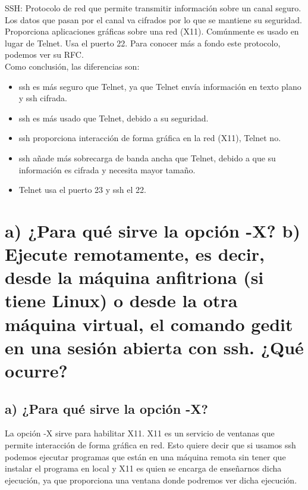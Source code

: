 	SSH\cite{ejercicio4-5,ejercicio4-6}: Protocolo de red que permite transmitir información sobre un canal seguro. Los datos que pasan por el canal va cifrados por lo que se mantiene su seguridad. Proporciona aplicaciones gráficas sobre una red (X11). Comúnmente es usado en lugar de Telnet. Usa el puerto 22. Para conocer más a fondo este protocolo, podemos ver su RFC\cite{ejercicio4-7}.
	\\
	
	Como conclusión, las diferencias son:
	\begin{itemize}
		\item ssh es más seguro que Telnet, ya que Telnet envía información en texto plano y ssh cifrada. 
		\item ssh es más usado que Telnet, debido a su seguridad.
		\item ssh proporciona interacción de forma gráfica en la red (X11), Telnet no.
		\item ssh añade más sobrecarga de banda ancha que Telnet, debido a que su información es cifrada y necesita mayor tamaño.
		\item Telnet usa el puerto 23 y ssh el 22.
	\end{itemize} 
	
	
	
	\section{a) ¿Para qué sirve la opción -X? b) Ejecute remotamente, es decir, desde la máquina anfitriona (si tiene Linux) o desde la otra máquina virtual, el comando gedit en una sesión abierta con ssh. ¿Qué ocurre?}
	
	
	\subsection{a) ¿Para qué sirve la opción -X?}
	
	La opción -X sirve para \cite{ejercicio5-1,ejercicio5-2,ejercicio5-3} habilitar X11. X11 es un servicio de ventanas que permite interacción de forma gráfica en red. Esto quiere decir que si usamos ssh podemos ejecutar programas que están en una máquina remota sin tener que instalar el programa en local y X11 es quien se encarga de enseñarnos dicha ejecución, ya que proporciona una ventana donde podremos ver dicha ejecución.
	

